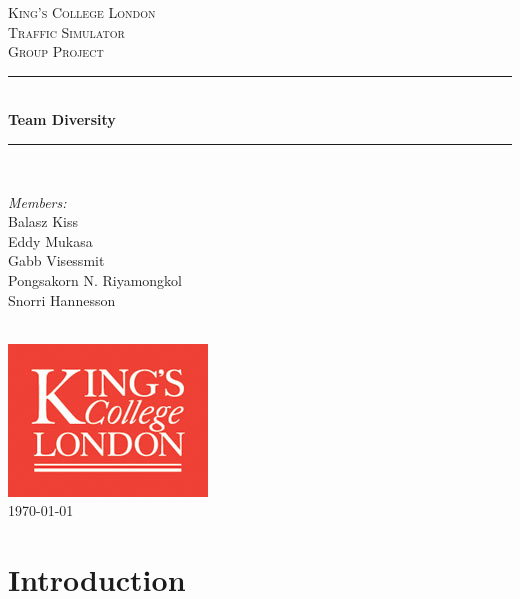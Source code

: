 \documentclass[11pt]{article}
\begin{document}

\begin{titlepage}

\newcommand{\HRule}{\rule{\linewidth}{0.5mm}}
\center
\textsc{\LARGE King's College London}\\[1.5cm]
\textsc{\Large Traffic Simulator}\\[0.5cm]
\textsc{\large Group Project}\\[0.5cm]
\HRule \\[0.4cm]
{ \huge \bfseries Team Diversity}\\[0.4cm]
\HRule \\[1.5cm]

\begin{minipage}{0.4\textwidth} \large
\begin{center}
\emph{Members:}\\
Balasz Kiss \\
Eddy Mukasa \\
Gabb Visessmit \\
Pongsakorn N. Riyamongkol \\
Snorri Hannesson
\end{center}
\end{minipage}
\\[2cm]

\includegraphics{KingsLogo}\\[1cm] 

{\large \today}\\[3cm]

\vfill

\end{titlepage}


\section{Introduction}
\end{document}
